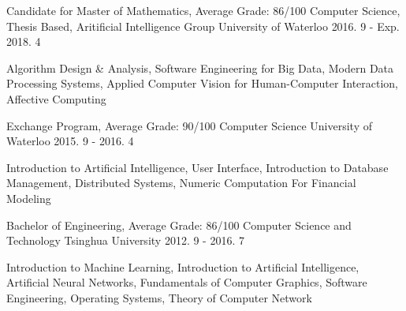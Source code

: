 \begin{cventries} 
  \cventry
    {Candidate for Master of Mathematics, Average Grade: 86/100}
    {Computer Science, Thesis Based, Aritificial Intelligence Group}
    {University of Waterloo}
    {2016. 9 - Exp. 2018. 4}
    {
      \begin{cvitems}
          \item{ Algorithm Design \& Analysis, Software Engineering for Big Data, Modern Data Processing Systems, Applied Computer Vision
for Human-Computer Interaction, Affective Computing}
      \end{cvitems}
    }
  \cventry
    {Exchange Program, Average Grade: 90/100}
    {Computer Science}
    {University of Waterloo}
    {2015. 9 - 2016. 4}
    {
      \begin{cvitems}
          \item {Introduction to Artificial Intelligence, User Interface, Introduction to Database Management, Distributed Systems, Numeric Computation For Financial Modeling}
      \end{cvitems}
    }
  \cventry
    {Bachelor of Engineering, Average Grade: 86/100}
    {Computer Science and Technology}
    {Tsinghua University}
    {2012. 9 - 2016. 7}
    {
      \begin{cvitems}
          \item {Introduction to Machine Learning, Introduction to Artificial Intelligence, Artificial Neural Networks, Fundamentals of Computer Graphics, Software Engineering, Operating Systems, Theory of Computer Network}
      \end{cvitems}
    }
\end{cventries}
